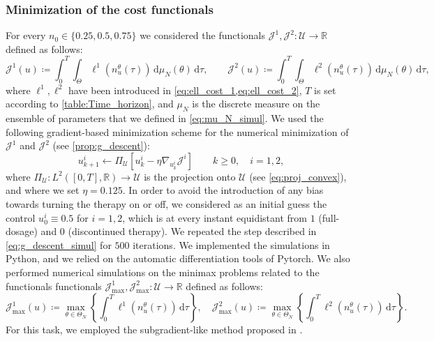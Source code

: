 \documentclass[a4paper,12pt, reqno]{amsart}
\theoremstyle{plain}
\theoremstyle{definition}
\theoremstyle{remark}
\numberwithin{equation}{section}
\newcommand{\J}{\mathcal{J}}
\newcommand{\R}{\mathbb{R}}
\newcommand{\U}{\mathcal{U}}
\newcommand{\de}{\,\mathrm{d}}
\begin{document}
\subsubsection*{Minimization of the cost functionals}
For every $n_0\in \{0.25,0.5,0.75\}$ we considered the functionals $\J^1,\J^2\colon \U \to \R$ defined as follows:
\begin{equation} \label{eq:funct_simul}
    \J^1(u) \coloneqq  \int_0^T 
    \int_\Theta  \ell^1 \left(n_u^\theta(\tau )\right)  \de\mu_N(\theta)
    \de \tau, \qquad
    \J^2(u) \coloneqq  \int_0^T 
    \int_\Theta  \ell^2 \left(n_u^\theta(\tau )\right)  \de\mu_N(\theta)
    \de \tau,
\end{equation}
where $\ell^1,\ell^2$ have been introduced in \cref{eq:ell_cost_1,eq:ell_cost_2}, $T$ is set according to \cref{table:Time_horizon}, and $\mu_N$ is the discrete measure on the ensemble of parameters that we defined in \cref{eq:mu_N_simul}.
We used the following gradient-based minimization scheme for the numerical minimization of $\J^1$ and $\J^2$ (see \cref{prop:g_descent}):
\begin{equation} \label{eq:g_descent_simul}
    u^i_{k+1} \gets \Pi_\U \left[ u_k^i - \eta \nabla_{u_k^i} \J^i \right]\qquad k\geq 0, \quad i=1,2,
\end{equation}
where $\Pi_\U\colon  L^2([0,T], \R) \to \U$ is the projection onto $\U$ (see \cref{eq:proj_convex}), and where we set $\eta=0.125$.
In order to avoid the introduction of any bias towards turning the therapy on or off, we considered as an initial guess the control $u^i_0\equiv 0.5$ for $i=1,2$, which is at every instant equi\-distant from $1$ (full-dosage) and $0$ (discontinued therapy).
We repeated the step described in \cref{eq:g_descent_simul} for $500$ iterations. 
We implemented the simulations in Python, and we relied on the automatic differentiation tools of Pytorch.
{ We also performed numerical simulations on the minimax problems related to the functionals functionals $\J^1_{\max},\J^2_{\max} \colon \U \to \R$ defined as follows:
\begin{equation*} %
    \J^1_{\max} (u) \coloneqq   \max_{\theta \in \Theta_N} \left\{ \int_0^T 
      \ell^1 \left(n_u^\theta(\tau )\right) 
    \de \tau \right\}, \quad
    \J^2_{\max} (u) \coloneqq  \max_{\theta \in \Theta_N} \left\{\int_0^T  \ell^2 \left(n_u^\theta(\tau )\right)  \de \tau \right\}.
\end{equation*}
For this task, we employed the subgradient-like method proposed in \cite[Algorithm~1]{Scag25}.
}
\end{document}
